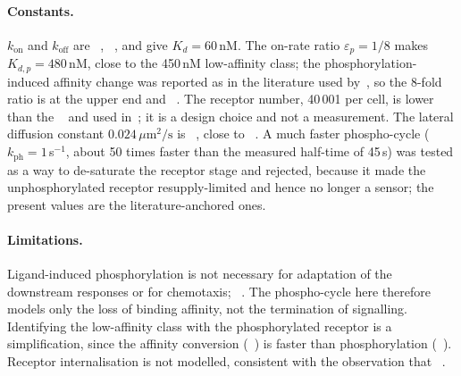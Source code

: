 \paragraph{Constants.}
$k_\mathrm{on}$ and $k_\mathrm{off}$ are ~\cite{biswas2021}, ~\cite{vanhaastert1984}, and give $K_d=60$\,nM.
The on-rate ratio $\varepsilon_p=1/8$ makes $K_{d,p}=480$\,nM, close to the 450\,nM low-affinity class; the phosphorylation-induced affinity change was reported as  in the literature used by~\cite{biswas2021}, so the 8-fold ratio is at the upper end and ~\cite{vanhaastert1984}.
The receptor number, 40\,001 per cell, is lower than the ~\cite{johnson1991} and used in~\cite{biswas2021}; it is a design choice and not a measurement.
The lateral diffusion constant $0.024\,\mu\mathrm{m^2/s}$ is ~\cite{takebayashi2023}, close to ~\cite{biswas2021,ueda2001}.
A much faster phospho-cycle ($k_\mathrm{ph}=1$\,s$^{-1}$, about 50 times faster than the measured half-time of 45\,s) was tested as a way to de-saturate the receptor stage and rejected, because it made the unphosphorylated receptor resupply-limited and hence no longer a sensor; the present values are the literature-anchored ones.

\paragraph{Limitations.}
Ligand-induced phosphorylation is not necessary for adaptation of the downstream responses or for chemotaxis; ~\cite{kim1997}.
The phospho-cycle here therefore models only the loss of binding affinity, not the termination of signalling.
Identifying the low-affinity class with the phosphorylated receptor is a simplification, since the affinity conversion (~\cite{vanhaastert1984}) is faster than phosphorylation (~\cite{vaughan1988}).
Receptor internalisation is not modelled, consistent with the observation that ~\cite{caterina1995b}.
